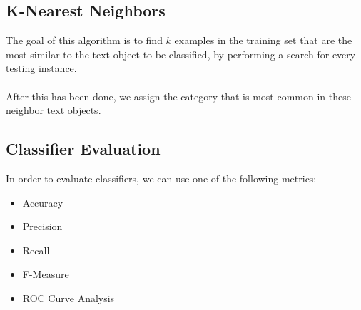 \documentclass{article}
\begin{document}
\subsection{K-Nearest Neighbors}
The goal of this algorithm is to find $k$ examples in the training set that are the most similar to the text object to be classified, by performing a search for every testing instance. \\ \\
After this has been done, we assign the category that is most common in these neighbor text objects.

\subsection{Classifier Evaluation}
In order to evaluate classifiers, we can use one of the following metrics:

\begin{itemize}
	\item Accuracy
	\item Precision
	\item Recall
	\item F-Measure
	\item ROC Curve Analysis
\end{itemize}
\end{document}
